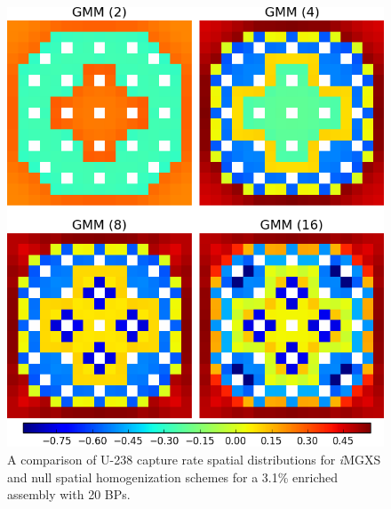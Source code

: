 \begin{figure}[h!]
\centering
\includegraphics[width=0.9\linewidth]{figures/results/compare/assm-31-20BPs/compare-capt}
\vspace{2mm}
\caption[U-238 capture rate comparison for a 3.1\% enriched assembly with 20 BPs]{A comparison of U-238 capture rate spatial distributions for \textit{i}\ac{MGXS} and null spatial homogenization schemes for a 3.1\% enriched assembly with 20 \acp{BP}.}
\label{fig:chap11-assm-31-20BPs-capt-rates}
\end{figure}

\clearpage

